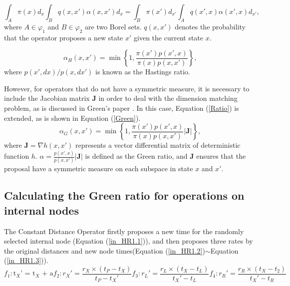 \documentclass{bmcart}
\begin{document}
\begin{backmatter}
\begin{equation}\label{balance}
\int_A {\pi (x) d_x} {\int_B  {q(x, x')}{\alpha(x, x')} d_x}  = \int_B {\pi (x') d_{x'}}{\int_A {q(x', x)}{\alpha(x', x)} d_{x'}} \text{,}
\end{equation}
where $A \in {\varphi_1}$ and $B \in  {\varphi_2}$ are two Borel sets. ${q(x, x')}$ denotes the probability that the operator proposes a new state $x'$ given the current state $x$.

\begin{equation}\label{Ratio}
{\alpha_H}(x, x') = \min \left\{ {1,\frac{{\pi (x'){p}(x',x)}}{{\pi (x){p}(x,x')}}} \right\} \text{,}
\end{equation}
where ${p(x',dx)}/{p(x,dx')}$ is known as the Hastings ratio.

However, for operators that do not have a symmetric measure, it is necessary to include the Jacobian matrix ${\mathbf{J}}$  in order to deal with the dimension matching problem, as is discussed in Green's paper \cite{green1995reversible}. In this case, Equation (\ref{Ratio}) is extended, as is shown in Equation (\ref{Green}).
\begin{equation}\label{Green}
{\alpha_G}(x, x') = \min \left\{ {1,\frac{{\pi (x'){p}(x',x)}}{{\pi (x){p}(x,x')}}}\left|{\mathbf{J}}\right| \right\} \text{,}
\end{equation}
where ${\mathbf{J}} = {\nabla h(x, x')}$ represents a vector differential matrix of deterministic function $h$. $\alpha = \frac{{p}(x',x)}{{p}(x,x')}\left|{\mathbf{J}}\right|$ is defined as the Green ratio, and ${\mathbf{J}}$ ensures that the proposal have a symmetric measure on each subspace in state $x$ and $x'$.

\subsection*{Calculating the Green ratio for operations on internal nodes}

The Constant Distance Operator firstly proposes a new time for the randomly selected internal node (Equation (\ref{in_HR1.1})), and then proposes three rates by the original distances and new node times(Equation (\ref{in_HR1.2})$\sim$Equation (\ref{in_HR1.3})).
\begin{subequations}\label{in_HR1}
\begin{equation}\label{in_HR1.1}
{f_1}:{{\text{t}}_X}{\text{'  =  }}{{\text{t}}_X}{\text{  +  a}}
\end{equation}
\begin{equation}\label{in_HR1.2}
{f_2}:{r_X}' = \frac{{{r_X} \times ({t_P} - {t_X})}}{{{t_P} - {t_X}'}}
\end{equation}
\begin{equation}
{f_3}:{r_L}' = \frac{{{r_L} \times ({t_X} - {t_L})}}{{{t_X}' - {t_L}}}
\end{equation}
\begin{equation}\label{in_HR1.3}
{f_4}:{r_R}' = \frac{{{r_R} \times ({t_X} - {t_2})}}{{{t_X}' - {t_R}}}
\end{equation}
\end{subequations}


\end{backmatter}
\end{document}
